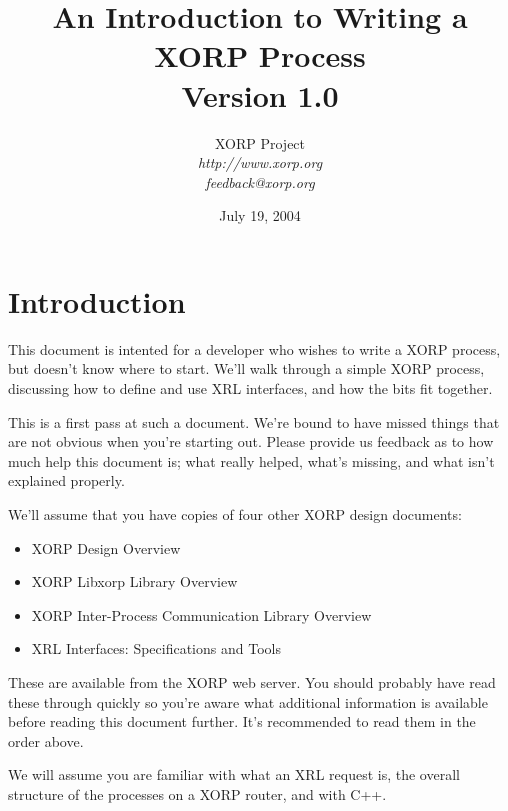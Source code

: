 \documentclass[11pt]{article}
\begin{document}
\title{An Introduction to Writing a XORP Process \\
\vspace{1ex}
Version 1.0}
\author{ XORP Project					\\
         {\it http://www.xorp.org}\\
	 {\it feedback@xorp.org}
}
\date{July 19, 2004}

\maketitle

\thispagestyle{empty}
\tableofcontents

\newpage
\section{Introduction}

This document is intented for a developer who wishes to write a XORP
process, but doesn't know where to start.  We'll walk through a simple
XORP process, discussing how to define and use XRL interfaces, and how
the bits fit together.  

This is a first pass at such a document.  We're bound to have missed
things that are not obvious when you're starting out.  Please provide
us feedback as to how much help this document is; what really helped,
what's missing, and what isn't explained properly.

We'll assume that you have copies of four other XORP design documents:
\begin{itemize}
\item XORP Design Overview\cite{xorp:design_arch}
\item XORP Libxorp Library Overview\cite{xorp:libxorp}
\item XORP Inter-Process Communication Library Overview\cite{xorp:xrl}
\item XRL Interfaces: Specifications and Tools\cite{xorp:xrl_interfaces}
\end{itemize}
These are available from the XORP web server.  You should probably
have read these through quickly so you're aware what additional
information is available before reading this document further.  It's
recommended to read them in the order above.  

We will assume you are familiar with what an XRL request is, the
overall structure of the processes on a XORP router, and with C++.
\end{document}
